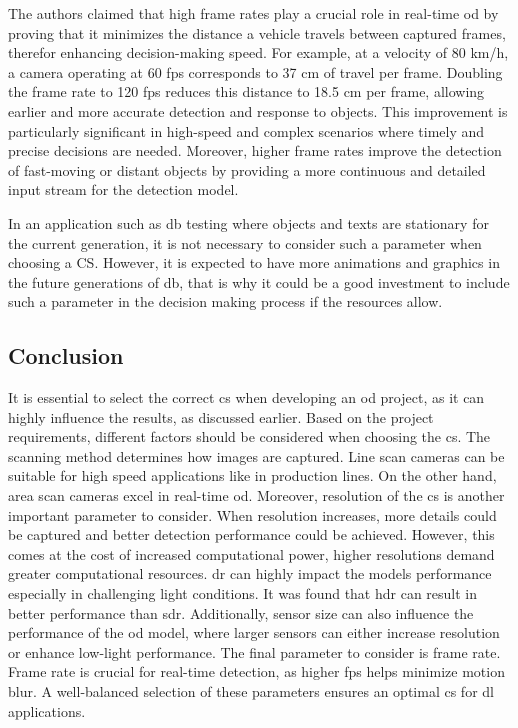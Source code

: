 The authors claimed that high frame rates play a crucial role in real-time \gls{od} by proving that it  minimizes the distance a vehicle travels between captured frames, therefor enhancing decision-making speed. For example, at a velocity of 80 km/h, a camera operating at 60 \gls{fps} corresponds to 37 cm of travel per frame. Doubling the frame rate to 120 \gls{fps} reduces this distance to 18.5 cm per frame, allowing earlier and more accurate detection and response to objects. This improvement is particularly significant in high-speed and complex scenarios where timely and precise decisions are needed. Moreover, higher frame rates improve the detection of fast-moving or distant objects by providing a more continuous and detailed input stream for the detection model.

In an application such as \gls{db} testing where objects and texts are stationary for the current generation, it is not necessary to consider such a parameter when choosing a CS. However, it is expected to have more animations and graphics in the future generations of \gls{db}, that is why it could be a good investment to include such a parameter in the decision making process if the resources allow.

\subsection{Conclusion}
It is essential to select the correct \gls{cs} when developing an \gls{od} project, as it can highly influence the results, as discussed earlier. Based on the project requirements, different factors should be considered when choosing the \gls{cs}. The scanning method determines how images are captured. Line scan cameras can be suitable for high speed applications like in production lines. On the other hand, area scan cameras excel in real-time \gls{od}. Moreover, resolution of the \gls{cs} is another important parameter to consider. When resolution increases, more details could be captured and better detection performance could be achieved. However, this comes at the cost of increased computational power, higher resolutions demand greater computational resources. \gls{dr} can highly impact the models performance especially in challenging light conditions. It was found that \gls{hdr} can result in better performance than \gls{sdr}. Additionally, sensor size can also influence the performance of the \gls{od} model, where larger sensors can either increase resolution or enhance low-light performance. The final parameter to consider is frame rate. Frame rate is crucial for real-time detection, as higher \gls{fps} helps minimize motion blur. A well-balanced selection of these parameters ensures an optimal \gls{cs} for \gls{dl} applications.

